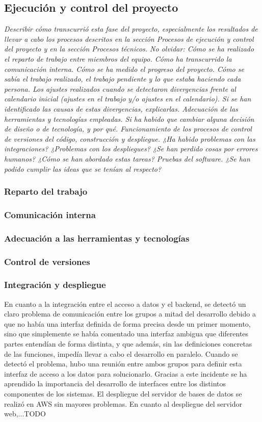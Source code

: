\subsection{Ejecución y control del proyecto}
\label{Ejecucion y control del proyecto}
\emph{
Describir cómo transcurrió esta fase del proyecto, especialmente los resultados de llevar a cabo los procesos descritos en la sección Procesos de ejecución y control del proyecto y en la sección Procesos técnicos. No olvidar:
Cómo se ha realizado el reparto de trabajo entre miembros del equipo. Cómo ha transcurrido la comunicación interna. 
Cómo se ha medido el progreso del proyecto. Cómo se sabía el trabajo realizado, el trabajo pendiente y lo que estaba haciendo cada persona.
Los ajustes realizados cuando se detectaron divergencias frente al calendario inicial (ajustes en el trabajo y/o ajustes en el calendario). Si se han identificado las causas de estas divergencias, explicarlas.
Adecuación de las herramientas y tecnologías empleadas. Si ha habido que cambiar alguna decisión de diseño o de tecnología, y por qué.
Funcionamiento de los procesos de control de versiones del código, construcción y despliegue. ¿Ha habido problemas con las integraciones? ¿Problemas con los despliegues? ¿Se han perdido cosas por errores humanos? ¿Cómo se han abordado estas tareas?
Pruebas del software. ¿Se han podido cumplir las ideas que se tenían al respecto?}
\subsubsection{Reparto del trabajo}
\subsubsection{Comunicación interna}
\subsubsection{Adecuación a las herramientas y tecnologías}
\subsubsection{Control de versiones}
\subsubsection{Integración y despliegue}
En cuanto a la integración entre el acceso a datos y el backend, se detectó un claro problema de comunicación entre los grupos a mitad del desarrollo debido a que no había una interfaz definida de forma precisa desde un primer momento, sino que simplemente se había comentado una interfaz ambigua que diferentes partes entendían de forma distinta, y que además, sin las definiciones concretas de las funciones, impedía llevar a cabo el desarrollo en paralelo. Cuando se detectó el problema, hubo una reunión entre ambos grupos para definir esta interfaz de acceso a los datos para solucionarlo. Gracias a este incidente se ha aprendido la importancia del desarrollo de interfaces entre los distintos componentes de los sistemas.
El despliegue del servidor de bases de datos se realizó en AWS sin mayores problemas. En cuanto al despliegue del servidor web,...TODO

